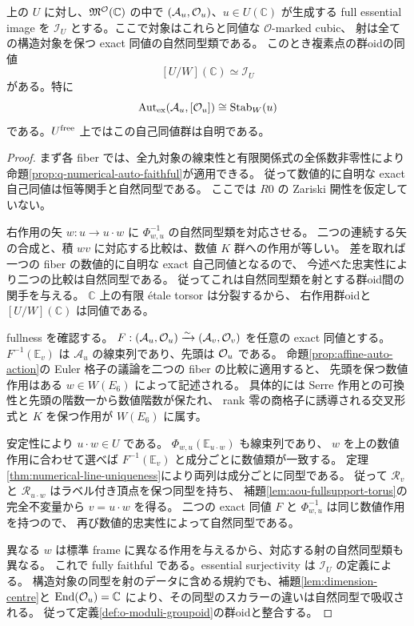 \begin{proposition}
\label{prop:weyl-chart-point-comparison}
上の $U$ に対し、$\mathfrak M^{\mathcal O}(\mathbb C)$ の中で
$(\mathcal A_u,\mathcal O_u)$、$u\in U(\mathbb C)$ が生成する full essential image を
$\mathcal I_U$ とする。ここで対象はこれらと同値な $\mathcal O$-marked cubic、
射は全ての構造対象を保つ exact 同値の自然同型類である。
このとき複素点の群oidの同値
\begin{equation}\label{eq:weyl-chart-point-groupoid}
 [U/W](\mathbb C)\simeq\mathcal I_U
\end{equation}
がある。特に
\[
 \operatorname{Aut}_{\rm ex}(\mathcal A_u,[\mathcal O_u])
 \cong\operatorname{Stab}_W(u)
\]
である。$U^{\rm free}$ 上ではこの自己同値群は自明である。
\end{proposition}
\begin{proof}
まず各 fiber では、全九対象の線束性と有限関係式の全係数非零性により
命題\ref{prop:q-numerical-auto-faithful}が適用できる。
従って数値的に自明な exact 自己同値は恒等関手と自然同型である。
ここでは $R0$ の Zariski 開性を仮定していない。

右作用の矢 $w:u\to u\cdot w$ に $\Phi_{w,u}^{-1}$ の自然同型類を対応させる。
二つの連続する矢の合成と、積 $wv$ に対応する比較は、数値 $K$ 群への作用が等しい。
差を取れば一つの fiber の数値的に自明な exact 自己同値となるので、
今述べた忠実性により二つの比較は自然同型である。
従ってこれは自然同型類を射とする群oid間の関手を与える。
$\mathbb C$ 上の有限 \'etale torsor は分裂するから、
右作用群oidと $[U/W](\mathbb C)$ は同値である。

fullness を確認する。
$F:(\mathcal A_u,\mathcal O_u)\xrightarrow{\sim}(\mathcal A_v,\mathcal O_v)$ を任意の exact 同値とする。
$F^{-1}(\mathbb E_v)$ は $\mathcal A_u$ の線束列であり、先頭は $\mathcal O_u$ である。
命題\ref{prop:affine-auto-action}の Euler 格子の議論を二つの fiber の比較に適用すると、
先頭を保つ数値作用はある $w\in W(E_6)$ によって記述される。
具体的には Serre 作用との可換性と先頭の階数一から数値階数が保たれ、
rank 零の商格子に誘導される交叉形式と $K$ を保つ作用が $W(E_6)$ に属す。

安定性により $u\cdot w\in U$ である。
$\Phi_{w,u}(\mathbb E_{u\cdot w})$ も線束列であり、
$w$ を上の数値作用に合わせて選べば $F^{-1}(\mathbb E_v)$ と成分ごとに数値類が一致する。
定理\ref{thm:numerical-line-uniqueness}により両列は成分ごとに同型である。
従って $\mathscr R_v$ と $\mathscr R_{u\cdot w}$ はラベル付き頂点を保つ同型を持ち、
補題\ref{lem:aou-fullsupport-torus}の完全不変量から $v=u\cdot w$ を得る。
二つの exact 同値 $F$ と $\Phi_{w,u}^{-1}$ は同じ数値作用を持つので、
再び数値的忠実性によって自然同型である。

異なる $w$ は標準 frame に異なる作用を与えるから、対応する射の自然同型類も異なる。
これで fully faithful である。essential surjectivity は $\mathcal I_U$ の定義による。
構造対象の同型を射のデータに含める規約でも、補題\ref{lem:dimension-centre}と
$\operatorname{End}(\mathcal O_u)=\mathbb C$ により、その同型のスカラーの違いは自然同型で吸収される。
従って定義\ref{def:o-moduli-groupoid}の群oidと整合する。
\end{proof}


